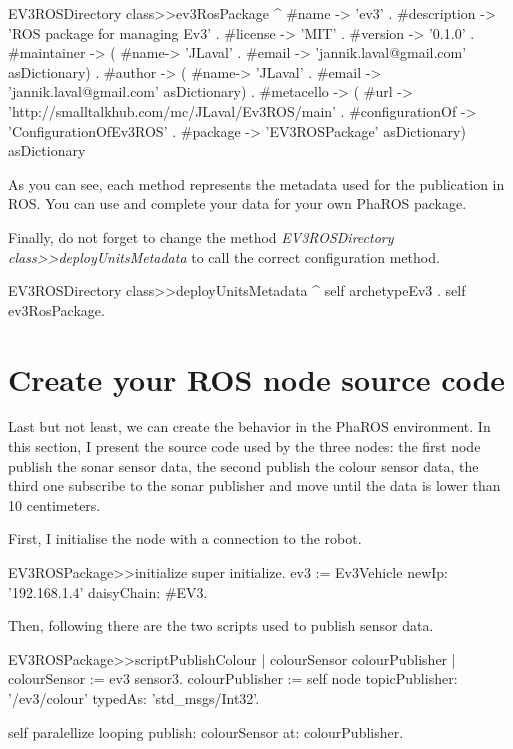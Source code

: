 \documentclass[a4paper,10pt,twoside]{book}
\begin{document}
\begin{code}{}	
EV3ROSDirectory class>>ev3RosPackage
	^ { 
			#name -> 'ev3' .
			#description -> 'ROS package for managing Ev3' . 
			#license ->  'MIT'  .
			#version -> '0.1.0' .
			#maintainer -> ({ 
				#name-> 'JLaval' . 
				#email -> 'jannik.laval@gmail.com' 
			}  asDictionary) .
			#author -> ({  
				#name-> 'JLaval' . 
				#email -> 'jannik.laval@gmail.com'  
			} asDictionary) .
			#metacello -> ({ 
				#url -> 'http://smalltalkhub.com/mc/JLaval/Ev3ROS/main' . 
				#configurationOf -> 'ConfigurationOfEv3ROS' .
				#package -> 'EV3ROSPackage'  
			} asDictionary)
		 } asDictionary 
\end{code}

As you can see, each method represents the metadata used for the publication in ROS. You can use and complete your data for your own PhaROS package. 

Finally, do not forget to change the method \emph{EV3ROSDirectory class>>deployUnitsMetadata} to call the correct configuration method.

\begin{code}{}	
EV3ROSDirectory class>>deployUnitsMetadata
	^ { 
		self archetypeEv3 .
		self ev3RosPackage.
	 }
\end{code}

\section{Create your ROS node source code}

Last but not least, we can create the behavior in the PhaROS environment.
In this section, I present the source code used by the three nodes: the first node publish the sonar sensor data, the second publish the colour sensor data, the third one subscribe to the sonar publisher and move until the data is lower than 10 centimeters.

First, I initialise the node with a connection to the robot.

\begin{code}{}	 
EV3ROSPackage>>initialize
	super initialize.
	ev3 := Ev3Vehicle newIp: '192.168.1.4' daisyChain: #EV3.
\end{code}

Then, following there are the two scripts used to publish sensor data.

\begin{code}{}
EV3ROSPackage>>scriptPublishColour
	| colourSensor colourPublisher |
	colourSensor := ev3 sensor3.
	colourPublisher := self node topicPublisher: '/ev3/colour' typedAs: 'std_msgs/Int32'.
	
	self paralellize looping publish: colourSensor at: colourPublisher.
\end{code}
\end{document}
